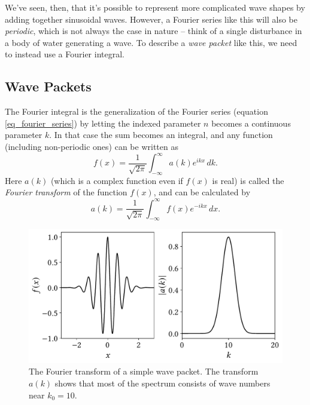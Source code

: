 We've seen, then, that it's possible to represent more complicated wave shapes by adding together sinusoidal waves.  However, a Fourier series like this will also be \emph{periodic}, which is not always the case in nature -- think of a single disturbance in a body of water generating a wave.  To describe a \emph{wave packet} like this, we need to instead use a Fourier integral.


\subsection{Wave Packets}

The Fourier integral is the generalization of the Fourier series (equation \ref{eq_fourier_series}) by letting the indexed parameter $n$ becomes a continuous parameter $k$.  In that case the sum becomes an integral, and any function (including non-periodic ones) can be written as
\begin{equation}
f(x) = \frac{1}{\sqrt{2\pi}} \int_{-\infty}^{\infty} a(k) e^{ikx} \, dk.
\end{equation}
Here $a(k)$ (which is a complex function even if $f(x)$ is real) is called the \emph{Fourier transform} of the function $f(x)$, and can be calculated by 
\[
a(k) = \frac{1}{\sqrt{2\pi}} \int_{-\infty}^{\infty} f(x) e^{-ikx} \, dx.
\]

\begin{figure}
\centering\includegraphics[width=0.8\linewidth]{Figures/Chapter5/fig_fourier_example}
\caption{The Fourier transform of a simple wave packet.  The transform $a(k)$ shows that most of the spectrum consists of wave numbers near $k_0 = 10$.}
\label{fig_fourier_example}
\end{figure}

